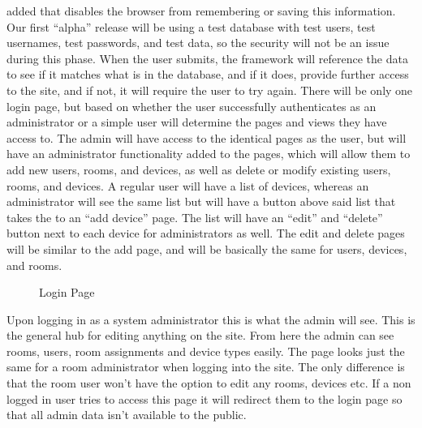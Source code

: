 \documentclass{report}
\begin{document}
added that disables the browser from remembering or saving this information. 
Our first “alpha” release will be using a test database with test users, test usernames, test passwords, and test data, so the security
will not be an issue during this phase. When the user submits, the framework will reference the data to see if it matches what is in the database, and if it does, provide further access to the site, and if not, it will require the user to try again. 
\newline
\indent
There will be only one login page, but based on whether the user successfully authenticates as an administrator or a simple user will determine the pages and views they have access to. 
The admin will have access to the identical pages as the user, but will have an administrator functionality added to the pages, which will allow them to add new users, rooms, and devices, as well as delete or modify existing users, rooms, and devices. 
A regular user will have a list of devices, whereas an administrator will see the same list but will have a button above said list that takes the to an “add device” page.  
The list will have an “edit” and “delete” button next to each device for administrators as well. The edit and delete pages will be similar to the add page, and will be basically the same for users, devices, and rooms. 
\begin{figure}[H]
\caption{Login Page}
\end{figure}
\newpage

Upon logging in as a system administrator this is what the admin will see.
This is the general hub for editing anything on the site.
From here the admin can see rooms, users, room assignments and device types easily.
The page looks just the same for a room administrator when logging into the site. 
The only difference is that the room user won't have the option to edit any rooms, devices etc.
If a non logged in user tries to access this page it will redirect them to the login page so that all admin data isn't available to the public.
\end{document}
